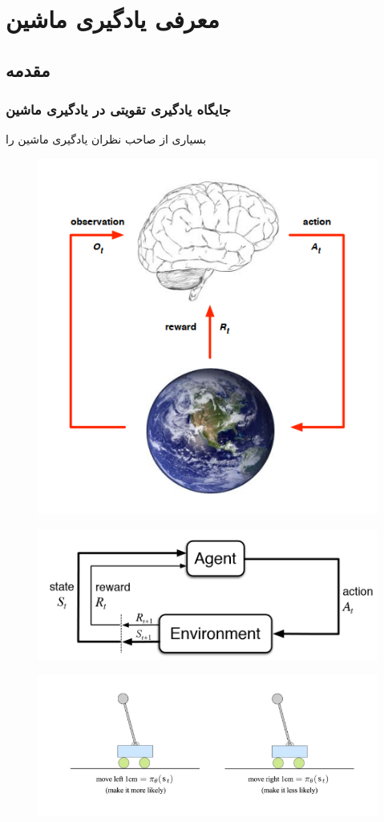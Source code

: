 \chapter{معرفی یادگیری ماشین}
\section{مقدمه}
\subsection{جایگاه یادگیری تقویتی در یادگیری ماشین}
بسیاری از صاحب نظران یادگیری ماشین را 
\begin{figure}
	\centering
	\includegraphics[width=0.7\linewidth]{Figures/RL/Enviroment-brain-as-agent}
	\caption{}
	\label{fig:enviroment-brain-as-agent}
\end{figure}
\begin{figure}
	\centering
	\includegraphics[width=0.7\linewidth]{Figures/RL/Markov-vhain-SARSA}
	\caption{}
	\label{fig:markov-vhain-sarsa}
\end{figure}
\begin{figure}
	\centering
	\includegraphics[width=0.7\linewidth]{Figures/RL/RL-cartpole}
	\caption{}
	\label{fig:rl-cartpole}
\end{figure}
